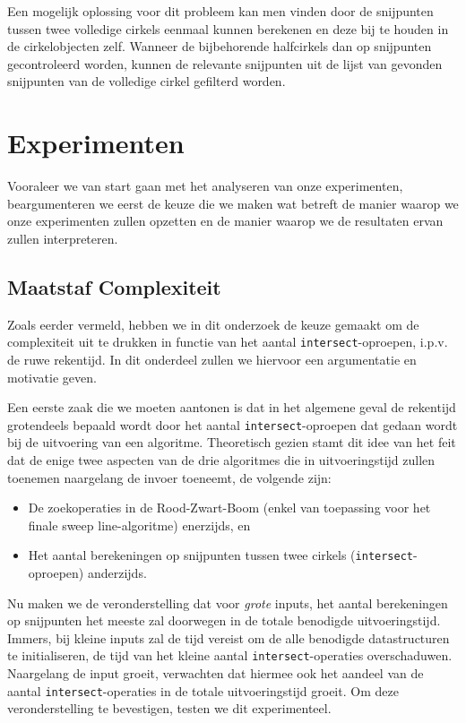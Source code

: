 \documentclass[12pt]{article}
\begin{document}
Een mogelijk oplossing voor dit probleem kan men vinden door de snijpunten tussen twee volledige cirkels eenmaal kunnen berekenen en deze bij te houden in de cirkelobjecten zelf. Wanneer de bijbehorende halfcirkels dan op snijpunten gecontroleerd worden, kunnen de relevante snijpunten uit de lijst van gevonden snijpunten van de volledige cirkel gefilterd worden.

\section{Experimenten}\label{sec:experimenten}
Vooraleer we van start gaan met het analyseren van onze experimenten, beargumenteren we eerst de keuze die we maken wat betreft de manier waarop we onze experimenten zullen opzetten en de manier waarop we de resultaten ervan zullen interpreteren.
\subsection{Maatstaf Complexiteit}\label{sec:maatstaf}
Zoals eerder vermeld, hebben we in dit onderzoek de keuze gemaakt om de complexiteit uit te drukken in functie van het aantal \texttt{intersect}-oproepen, i.p.v. de ruwe rekentijd. In dit onderdeel zullen we hiervoor een argumentatie en motivatie geven.

Een eerste zaak die we moeten aantonen is dat in het algemene geval de rekentijd grotendeels bepaald wordt door het aantal \texttt{intersect}-oproepen dat gedaan wordt bij de uitvoering van een algoritme. Theoretisch gezien stamt dit idee van het feit dat de enige twee aspecten van de drie algoritmes die in uitvoeringstijd zullen toenemen naargelang de invoer toeneemt, de volgende zijn:
\begin{itemize}
\item  De zoekoperaties in de Rood-Zwart-Boom (enkel van toepassing voor het finale sweep line-algoritme) enerzijds, en
\item  Het aantal berekeningen op snijpunten tussen twee cirkels (\texttt{intersect}-oproepen) anderzijds.
\end{itemize}

Nu maken we de veronderstelling dat voor \textit{grote} inputs, het aantal berekeningen op snijpunten het meeste zal doorwegen in de totale benodigde uitvoeringstijd. Immers, bij kleine inputs zal de tijd vereist om de alle benodigde datastructuren te initialiseren, de tijd van het kleine aantal \texttt{intersect}-operaties overschaduwen. Naargelang de input groeit, verwachten dat hiermee ook het aandeel van de aantal \texttt{intersect}-operaties in de totale uitvoeringstijd groeit. Om deze veronderstelling te bevestigen, testen we dit experimenteel.
\end{document}
